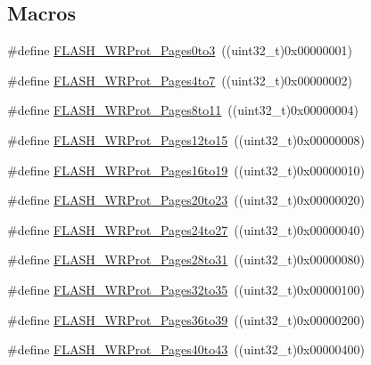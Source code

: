 \subsection*{Macros}
\begin{DoxyCompactItemize}
\item 
\#define \hyperlink{group___option___bytes___write___protection_gac5c6f6155e4ebae0978a3d2a0d991e68}{F\+L\+A\+S\+H\+\_\+\+W\+R\+Prot\+\_\+\+Pages0to3}~((uint32\+\_\+t)0x00000001)
\item 
\#define \hyperlink{group___option___bytes___write___protection_ga1b33c4de30c55331e7e60c0795c824ad}{F\+L\+A\+S\+H\+\_\+\+W\+R\+Prot\+\_\+\+Pages4to7}~((uint32\+\_\+t)0x00000002)
\item 
\#define \hyperlink{group___option___bytes___write___protection_ga7eca7a8b11accdd6dadf3445847e1a57}{F\+L\+A\+S\+H\+\_\+\+W\+R\+Prot\+\_\+\+Pages8to11}~((uint32\+\_\+t)0x00000004)
\item 
\#define \hyperlink{group___option___bytes___write___protection_gaa02b9439f75982e2e1c14f8af9a8c091}{F\+L\+A\+S\+H\+\_\+\+W\+R\+Prot\+\_\+\+Pages12to15}~((uint32\+\_\+t)0x00000008)
\item 
\#define \hyperlink{group___option___bytes___write___protection_gaa589ce30909c3a9a0bffc8a59b6013fb}{F\+L\+A\+S\+H\+\_\+\+W\+R\+Prot\+\_\+\+Pages16to19}~((uint32\+\_\+t)0x00000010)
\item 
\#define \hyperlink{group___option___bytes___write___protection_ga537e0f85899e13ca2ed93455e537d950}{F\+L\+A\+S\+H\+\_\+\+W\+R\+Prot\+\_\+\+Pages20to23}~((uint32\+\_\+t)0x00000020)
\item 
\#define \hyperlink{group___option___bytes___write___protection_ga1d6b94b48e0dd21949139267b90a08ef}{F\+L\+A\+S\+H\+\_\+\+W\+R\+Prot\+\_\+\+Pages24to27}~((uint32\+\_\+t)0x00000040)
\item 
\#define \hyperlink{group___option___bytes___write___protection_ga800860d071cfb40b1b0e94111a0cb549}{F\+L\+A\+S\+H\+\_\+\+W\+R\+Prot\+\_\+\+Pages28to31}~((uint32\+\_\+t)0x00000080)
\item 
\#define \hyperlink{group___option___bytes___write___protection_ga81a4250850e5fe7c251365cc22839a96}{F\+L\+A\+S\+H\+\_\+\+W\+R\+Prot\+\_\+\+Pages32to35}~((uint32\+\_\+t)0x00000100)
\item 
\#define \hyperlink{group___option___bytes___write___protection_ga783f47425af52b9a12914520d9ee175e}{F\+L\+A\+S\+H\+\_\+\+W\+R\+Prot\+\_\+\+Pages36to39}~((uint32\+\_\+t)0x00000200)
\item 
\#define \hyperlink{group___option___bytes___write___protection_ga30798723c36db2b8145b6a5c8ffafded}{F\+L\+A\+S\+H\+\_\+\+W\+R\+Prot\+\_\+\+Pages40to43}~((uint32\+\_\+t)0x00000400)

\end{DoxyCompactItemize}
